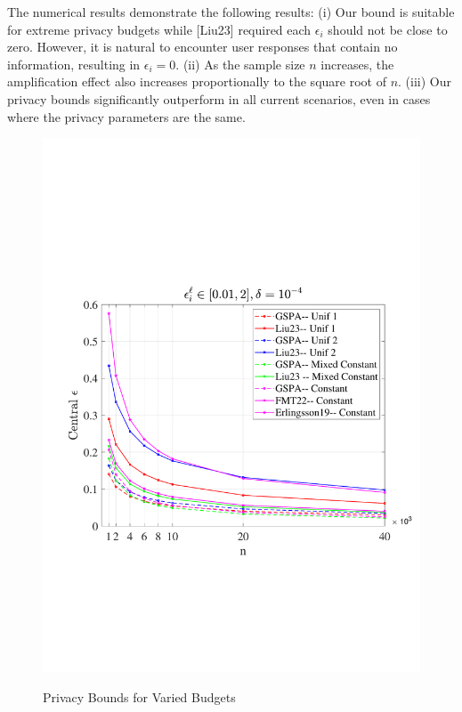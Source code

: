 \documentclass[letterpaper]{article} %
\begin{document}
 The numerical results demonstrate the following results:
(i) Our bound is suitable for extreme privacy budgets while [Liu23] required each $\epsilon_i$ should not be close to zero. However, it is natural to encounter user responses that contain no information, resulting in $\epsilon_i=0$.
(ii) As the sample size $n$ increases, the amplification effect also increases proportionally to the square root of $n$.
(iii) Our privacy bounds significantly outperform in all current scenarios, even in cases where the privacy parameters are the same.
\begin{figure}[htbp]
  \centering
  \includegraphics[scale=0.35]{picture/PrivacyBoundComp.pdf}\\
  \caption{Privacy Bounds for Varied Budgets}\label{Fig:VsLiu}
\end{figure}
\end{document}
